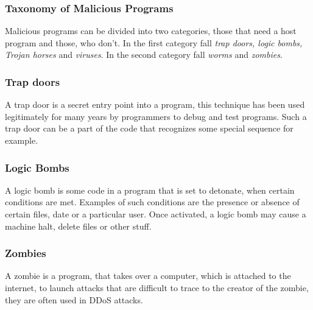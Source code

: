 \documentclass[a4paper, 10 pt, conference]{ieeeconf}
\begin{document}
\vspace{0.5cm}
\subsubsection{\textbf{Taxonomy of Malicious Programs}}
Malicious programs can be divided into two categories, those that need a host program and those, who don't. In the first category fall \emph{trap doors, logic bombs, Trojan horses} and \emph{viruses}. 
In the second category fall \emph{worms} and \emph{zombies}. 
\vspace{0.5cm}
\subsubsection{\textbf{Trap doors}}
\label{trapd}
A trap door is a secret entry point into a program, this technique has been used legitimately for many years by programmers to debug and test programs. Such a trap door can be a part of the code that recognizes some special sequence for example. 
\vspace{0.5cm}
\subsubsection{\textbf{Logic Bombs}}
A logic bomb is some code in a program that is set to detonate, when certain conditions are met. Examples of such conditions are the presence or absence of certain files, date or a particular user. Once activated, a logic bomb may cause a machine halt, delete files or other stuff.
\vspace{0.5cm} 
\subsubsection{\textbf{Zombies}}
A zombie is a program, that takes over a computer, which is attached to the internet, to launch attacks that are difficult to trace to the creator of the zombie, they are often used in DDoS attacks. 
\vspace{0.5cm}
\end{document}
